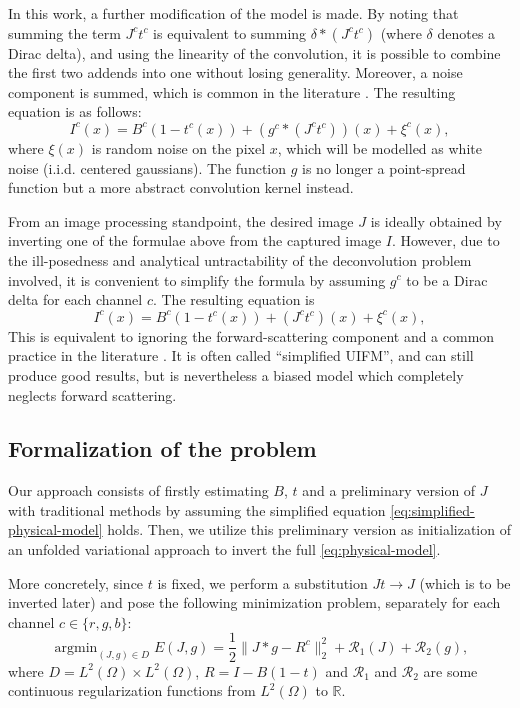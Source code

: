 \documentclass[twocolumn,twoside,a4paper,10pt]{IEEEtran}
\DeclareMathOperator*{\argmin}{\operatorname*{argmin}}
\DeclareMathOperator*{\argmin}{arg\,min}
\begin{document}
In this work, a further modification of the model is made. By noting that summing the term \(J^ct^c\) is equivalent to summing \(\delta\ast(J^ct^c)\) (where \(\delta\) denotes a Dirac delta), and using the linearity of the convolution, it is possible to combine the first two addends into one without
losing generality. Moreover, a noise component is summed, which is common in the literature \cite{xie2021variational}. The resulting equation is as follows:
\begin{equation}\label{eq:physical-model}
  I^c(x) = B^c\left(1 - t^c(x)\right) + \left(g^c\ast\left(J^c t^c\right)\right) (x) + \xi^c(x),
\end{equation}
where \(\xi(x)\) is random noise on the pixel \(x\), which will be modelled as white noise (i.i.d. centered gaussians). The function \(g\) is no longer a point-spread function but a more abstract convolution kernel instead.

From an image processing standpoint, the desired image \(J\) is ideally obtained by inverting one of the formulae above from the captured image \(I\). However, due to the ill-posedness and analytical untractability of the deconvolution problem involved, it is convenient to simplify the formula by assuming \(g^c\) to be a Dirac delta for each channel \(c\). The resulting equation is
\begin{equation}\label{eq:simplified-physical-model}
  I^c(x) = B^c\left(1 - t^c(x)\right) + \left(J^c t^c\right) (x) + \xi^c(x),
\end{equation}
This is equivalent to ignoring the forward-scattering component and a common practice in the literature \cite{ancuti2017color}. It is often called ``simplified UIFM'', and can still produce good results, but is nevertheless a biased model which completely neglects forward scattering.

\subsection{Formalization of the problem}\label{subsec:formalization}
Our approach consists of firstly estimating \(B\), \(t\) and a preliminary version of \(J\) with traditional methods by assuming the simplified equation \cref{eq:simplified-physical-model} holds. Then, we utilize this preliminary version as initialization of an unfolded variational approach to invert the full \cref{eq:physical-model}.

More concretely, since \(t\) is fixed, we perform a substitution \(Jt\to J\) (which is to be inverted later) and pose the following minimization problem, separately for each channel \(c\in\{r, g, b\}\):
\begin{equation}\label{eq:full-I2-functional}
  \argmin_{(J, g)\in D} E(J, g) = \frac12\|J\ast g - R^c\|_2^2 + \mathcal{R}_1(J) + \mathcal{R}_2(g),
\end{equation}
where \(D = L^2(\Omega)\times L^2(\Omega)\), \(R = I - B(1-t)\) and \(\mathcal{R}_1\) and \(\mathcal{R}_2\) are some continuous regularization functions from \(L^2(\Omega)\) to \(\mathbb{R}\).
\end{document}
